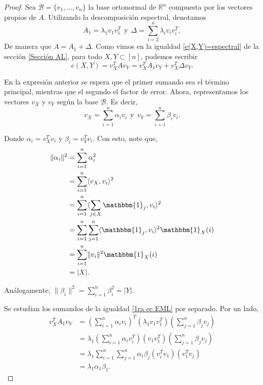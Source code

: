 \documentclass{article}[14pts]
\providecommand{\norm}[1]{\lVert#1\rVert}
\providecommand{\norm}[1]{\lVert#1\rVert}
\begin{document}
\begin{proof}
    Sea $\mathcal{B} = \lbrace v_1,...,v_n\rbrace$ la base ortonormal de $\mathbb{R}^{n}$ compuesta por los vectores propios de $A$. Utilizando la descomposición espectral, denotamos
    \begin{equation*}
        A_1 = \lambda_1 v_1 v_{1}^{T}\ \ \text{y}\ \ \Delta = \sum_{i=2}^{n} \lambda_i v_i v_{i}^{T},
    \end{equation*}
    De manera que $A = A_1 + \Delta$. Como vimos en la igualdad \eqref{e(X,Y)=espectral} de la sección \ref{Sección AL}, para todo $X,Y\subset [n]$, podemos escribir
    \begin{equation} \label{1ra ec EML}
        e(X,Y) = v_{X}^{T} A v_Y = v_{X}^{T} A_1 v_Y + v_{X}^{T} \Delta v_Y.
    \end{equation}

    En la expresión anterior se espera que el primer sumando sea el término principal, mientras que el segundo el factor de error. Ahora, representamos los vectores $v_X$ y $v_Y$ según la base $\mathcal{B}$. Es decir,
    \begin{equation*}
        v_X = \sum_{i=1}^{n} \alpha_i v_i\ \ \text{y}\ \ v_Y = \sum_{i=1}^{n} \beta_i v_i.
    \end{equation*}

    Donde $\alpha_i = v_{X}^{T}v_i$ y $\beta_i = v_{Y}^{T} v_i$. Con esto, note que,
    \begin{align*}
        \norm{\alpha_i}^{2} &= \sum_{i=1}^{n}\alpha_{i}^{2}\\
        &= \sum_{i=1}^{n} \langle v_X, v_i\rangle^{2}\\
        &= \sum_{i=1}^{n} \langle \sum_{j\in X}\mathbbm{1}_{j}, v_i\rangle^{2}\\
        &= \sum_{i=1}^{n}\sum_{j=1}^{n} \langle \mathbbm{1}_{j}, v_i\rangle^{2}\mathbbm{1}_{X}(i)\\
        &= \sum_{i=1}^{n} \norm{v_i}^{2}\mathbbm{1}_{X}(i)\\
        &= |X|.
    \end{align*}

    Análogamente, $\norm{\beta_i}^{2} = \sum_{i=1}^{n} \beta_{i}^{2} = |Y|$.\medskip

    Se estudian los sumandos de la igualdad \eqref{1ra ec EML} por separado. Por un lado,
    \begin{equation} \label{1er sumando EML}
        \begin{split}
            v_{X}^{T} A_1 v_Y &= \left( \sum_{i=1}^{n}\alpha_i v_i\right)^{T}\left( \lambda_1 v_1 v_{1}^{T}\right)\left( \sum_{j=1}^{n} \beta_j v_j\right)\\
            &= \lambda_1 \left( \sum_{i=1}^{n} \alpha_i v_{i}^{T}\right)\left( v_1 v_{1}^{T}\right)\left( \sum_{j=1}^{n}\beta_j v_j\right)\\
            &= \lambda_1 \sum_{i=1}^{n}\sum_{j=1}^{n} \alpha_i \beta_j \left( v_{i}^{T} v_1\right)\left(v_{1}^{T} v_j \right)\\
            &= \lambda_1\alpha_1\beta_1 .
        \end{split}
    \end{equation}


\end{proof}
\end{document}
